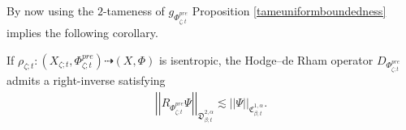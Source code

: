 \documentclass[psamsfonts]{amsart}
\theoremstyle{plain}
\theoremstyle{definition}{
\newtheorem{defi}{Definition}[section]
\newtheorem{ass}{Assumption}
\newtheorem*{nota}{Notation}}
\theoremstyle{remark}{
\newtheorem{rem}{Remark}
\newtheorem{ex}{Example}}
\theoremstyle{plain}{
\newtheorem{thm}{Theorem}[section]
\newtheorem{lem}{Lemma}[section]
\newtheorem{cor}{Corollary}[section]
\newtheorem{prop}{Proposition}[section]
\newtheorem{con}{Conjecture}[section]}
\newcommand{\m}[1]{{\mathrm{#1}}}
\begin{document}
By now using the $2$-tameness of $g_{\Phi^{pre}_{\zeta;t}}$ Proposition \ref{tameuniformboundedness} implies the following corollary.

\begin{cor}
\label{uniformlyboundedrightinverse}
    If $\rho_{\zeta;t}\colon(X_{\zeta;t},\Phi^{pre}_{\zeta;t})\dashrightarrow (X,\Phi)$ is isentropic, the Hodge--de Rham operator $D_{\Phi^{pre}_{\zeta;t}}$ admits a right-inverse satisfying 
    \begin{align*}
        \left|\left|R_{\Phi^{pre}_{\zeta;t}}\Psi\right|\right|_{\mathfrak{D}^{2,\alpha}_{\beta;t}}\lesssim\left|\left|\Psi\right|\right|_{\mathfrak{C}^{1,\alpha}_{\beta;t}}.
    \end{align*}
\end{cor}







\end{document}
